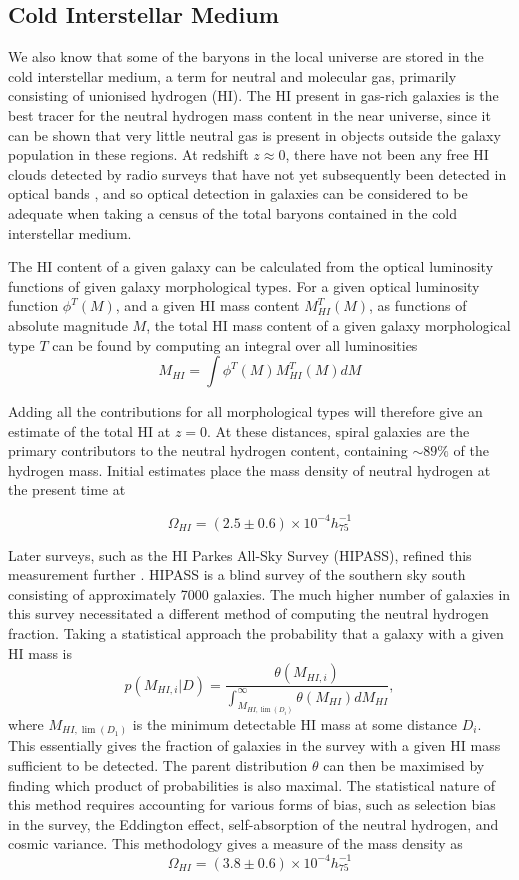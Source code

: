 \subsection{Cold Interstellar Medium}
We also know that some of the baryons in the local universe are stored in the cold interstellar medium, a term for neutral and molecular gas, primarily consisting of unionised hydrogen (HI). The HI present in gas-rich galaxies is the best tracer for the neutral hydrogen mass content in the near universe, since it can be shown that very little neutral gas is present in objects outside the galaxy population in these regions. At redshift $z \approx 0$, there have not been any free HI clouds detected by radio surveys that have not yet subsequently been detected in optical bands \citep{1993ApJ...419..515R}, and so optical detection in galaxies can be considered to be adequate when taking a census of the total baryons contained in the cold interstellar medium. 
\par The HI content of a given galaxy can be calculated from the optical luminosity functions of given galaxy morphological types. For a given optical luminosity function $\phi^T(M)$, and a given HI mass content $M_{HI}^T(M)$, as functions of absolute magnitude $M$, the total HI mass content of a given galaxy morphological type $T$ can be found by computing an integral over all luminosities
$$M_{HI} = \int \phi^T(M) M_{HI}^T(M) dM $$

Adding all the contributions for all morphological types will therefore give an estimate of the total HI at $z=0$. At these distances, spiral galaxies are the primary contributors to the neutral hydrogen content, containing $\sim 89\%$ of the hydrogen mass. Initial estimates \citep{1993ApJ...419..515R} place the mass density of neutral hydrogen at the present time at 

$$\Omega_{HI} = (2.5 \pm 0.6) \times 10^{-4} h_{75}^{-1} $$

Later surveys, such as the HI Parkes All-Sky Survey (HIPASS), refined this measurement further \citep{2003AJ....125.2842Z}. HIPASS is a blind survey of the southern sky south consisting of approximately 7000 galaxies. The much higher number of galaxies in this survey necessitated a different method of computing the neutral hydrogen fraction. Taking a statistical approach the probability that a galaxy with a given HI mass is
$$ p(M_{HI,i}|D) = \frac{\theta(M_{HI,i})}{\int_{M_{HI,\lim(D_i)}}^\infty \theta(M_{HI}) dM_{HI}}, $$
where $M_{HI,\lim(D_1)}$ is the minimum detectable HI mass at some distance $D_i$. This essentially gives the fraction of galaxies in the survey with a given HI mass sufficient to be detected. The parent distribution $\theta$ can then be maximised by finding which product of probabilities is also maximal. The statistical nature of this method requires accounting for various forms of bias, such as selection bias in the survey, the Eddington effect, self-absorption of the neutral hydrogen, and cosmic variance. This methodology gives a measure of the mass density as 
$$\Omega_{HI} = (3.8 \pm 0.6) \times 10^{-4} h_{75}^{-1} $$
